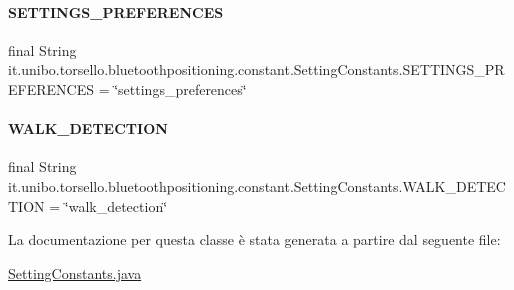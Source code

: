 \hypertarget{classit_1_1unibo_1_1torsello_1_1bluetoothpositioning_1_1constant_1_1SettingConstants_ae1b406c787a7efb87d585d5c8b80493d_ae1b406c787a7efb87d585d5c8b80493d}{}\label{classit_1_1unibo_1_1torsello_1_1bluetoothpositioning_1_1constant_1_1SettingConstants_ae1b406c787a7efb87d585d5c8b80493d_ae1b406c787a7efb87d585d5c8b80493d} 
\paragraph{\texorpdfstring{S\+E\+T\+T\+I\+N\+G\+S\+\_\+\+P\+R\+E\+F\+E\+R\+E\+N\+C\+ES}{SETTINGS\_PREFERENCES}}
{\footnotesize\ttfamily final String it.\+unibo.\+torsello.\+bluetoothpositioning.\+constant.\+Setting\+Constants.\+S\+E\+T\+T\+I\+N\+G\+S\+\_\+\+P\+R\+E\+F\+E\+R\+E\+N\+C\+ES = \char`\"{}settings\+\_\+preferences\char`\"{}\hspace{0.3cm}{\ttfamily [static]}}

\hypertarget{classit_1_1unibo_1_1torsello_1_1bluetoothpositioning_1_1constant_1_1SettingConstants_a66fa1d5e38bf015d7ec503cc2ae5448b_a66fa1d5e38bf015d7ec503cc2ae5448b}{}\label{classit_1_1unibo_1_1torsello_1_1bluetoothpositioning_1_1constant_1_1SettingConstants_a66fa1d5e38bf015d7ec503cc2ae5448b_a66fa1d5e38bf015d7ec503cc2ae5448b} 
\paragraph{\texorpdfstring{W\+A\+L\+K\+\_\+\+D\+E\+T\+E\+C\+T\+I\+ON}{WALK\_DETECTION}}
{\footnotesize\ttfamily final String it.\+unibo.\+torsello.\+bluetoothpositioning.\+constant.\+Setting\+Constants.\+W\+A\+L\+K\+\_\+\+D\+E\+T\+E\+C\+T\+I\+ON = \char`\"{}walk\+\_\+detection\char`\"{}\hspace{0.3cm}{\ttfamily [static]}}



La documentazione per questa classe è stata generata a partire dal seguente file\+:\begin{DoxyCompactItemize}
\item 
\hyperlink{SettingConstants_8java}{Setting\+Constants.\+java}\end{DoxyCompactItemize}
